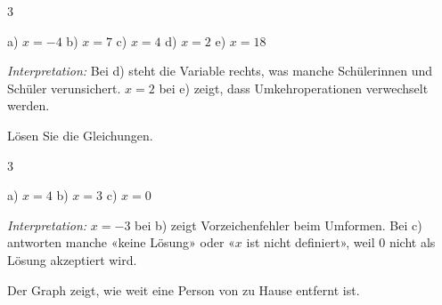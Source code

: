\documentclass[11pt]{exam}
\newcommand{\aufgabe}[1]{%
  \needspace{8\baselineskip}%
  \renewcommand{\questionlabel}{\textbf{#1}}%
  \question}
\newcommand{\raum}[1]{\ifprintanswers\else\fillwithgrid{#1}\fi}
\newcommand{\diagnose}[1]{\par\smallskip\textit{Interpretation:} #1}
\begin{document}
\begin{questions}
\begin{multicols}{3}
\end{multicols}
\begin{solution}
  a) $x = -4$ \quad b) $x = 7$ \quad c) $x = 4$ \quad d) $x = 2$ \quad
  e) $x = 18$
  \diagnose{Bei d) steht die Variable rechts, was manche Schülerinnen und
  Schüler verunsichert. $x = 2$ bei e) zeigt, dass Umkehroperationen
  verwechselt werden.}
\end{solution}
\raum{3.5cm}

\aufgabe{6.4}
Lösen Sie die Gleichungen.
\begin{multicols}{3}
\end{multicols}
\begin{solution}
  a) $x = 4$ \quad b) $x = 3$ \quad c) $x = 0$
  \diagnose{$x = -3$ bei b) zeigt Vorzeichenfehler beim Umformen. Bei c)
  antworten manche «keine Lösung» oder «$x$ ist nicht definiert», weil $0$
  nicht als Lösung akzeptiert wird.}
\end{solution}
\raum{3.5cm}

\aufgabe{7.3}
Der Graph zeigt, wie weit eine Person von zu Hause entfernt ist.

\begin{center}
\end{center}
\begin{parts}

\end{parts}
\end{questions}
\end{document}
